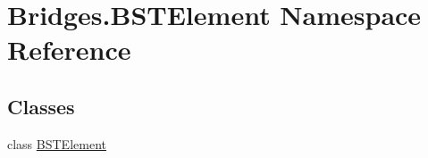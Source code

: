 \hypertarget{namespace_bridges_1_1_b_s_t_element}{}\section{Bridges.\+B\+S\+T\+Element Namespace Reference}
\label{namespace_bridges_1_1_b_s_t_element}
\subsection*{Classes}
\begin{DoxyCompactItemize}
\item 
class \mbox{\hyperlink{class_bridges_1_1_b_s_t_element_1_1_b_s_t_element}{B\+S\+T\+Element}}
\end{DoxyCompactItemize}
